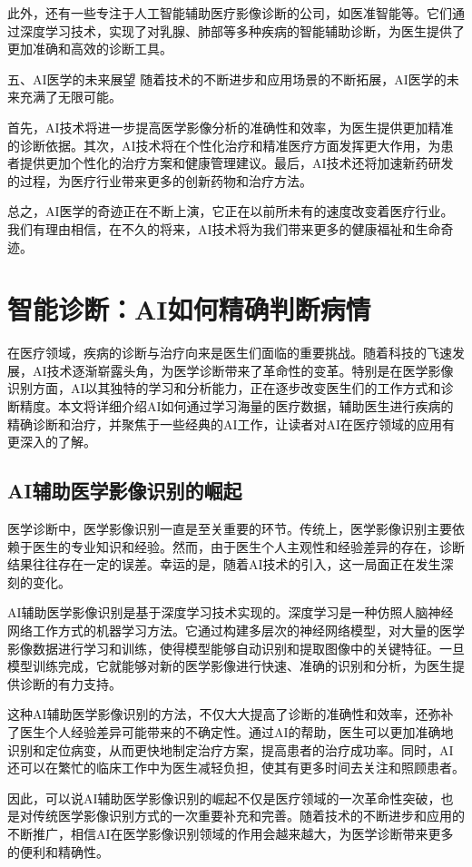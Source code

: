 此外，还有一些专注于人工智能辅助医疗影像诊断的公司，如医准智能等。它们通过深度学习技术，实现了对乳腺、肺部等多种疾病的智能辅助诊断，为医生提供了更加准确和高效的诊断工具。

五、AI医学的未来展望
随着技术的不断进步和应用场景的不断拓展，AI医学的未来充满了无限可能。

首先，AI技术将进一步提高医学影像分析的准确性和效率，为医生提供更加精准的诊断依据。其次，AI技术将在个性化治疗和精准医疗方面发挥更大作用，为患者提供更加个性化的治疗方案和健康管理建议。最后，AI技术还将加速新药研发的过程，为医疗行业带来更多的创新药物和治疗方法。

总之，AI医学的奇迹正在不断上演，它正在以前所未有的速度改变着医疗行业。我们有理由相信，在不久的将来，AI技术将为我们带来更多的健康福祉和生命奇迹。

\section{智能诊断：AI如何精确判断病情}
在医疗领域，疾病的诊断与治疗向来是医生们面临的重要挑战。随着科技的飞速发展，AI技术逐渐崭露头角，为医学诊断带来了革命性的变革。特别是在医学影像识别方面，AI以其独特的学习和分析能力，正在逐步改变医生们的工作方式和诊断精度。本文将详细介绍AI如何通过学习海量的医疗数据，辅助医生进行疾病的精确诊断和治疗，并聚焦于一些经典的AI工作，让读者对AI在医疗领域的应用有更深入的了解。
\subsection{AI辅助医学影像识别的崛起}
医学诊断中，医学影像识别一直是至关重要的环节。传统上，医学影像识别主要依赖于医生的专业知识和经验。然而，由于医生个人主观性和经验差异的存在，诊断结果往往存在一定的误差。幸运的是，随着AI技术的引入，这一局面正在发生深刻的变化。

AI辅助医学影像识别是基于深度学习技术实现的。深度学习是一种仿照人脑神经网络工作方式的机器学习方法。它通过构建多层次的神经网络模型，对大量的医学影像数据进行学习和训练，使得模型能够自动识别和提取图像中的关键特征。一旦模型训练完成，它就能够对新的医学影像进行快速、准确的识别和分析，为医生提供诊断的有力支持。

这种AI辅助医学影像识别的方法，不仅大大提高了诊断的准确性和效率，还弥补了医生个人经验差异可能带来的不确定性。通过AI的帮助，医生可以更加准确地识别和定位病变，从而更快地制定治疗方案，提高患者的治疗成功率。同时，AI还可以在繁忙的临床工作中为医生减轻负担，使其有更多时间去关注和照顾患者。

因此，可以说AI辅助医学影像识别的崛起不仅是医疗领域的一次革命性突破，也是对传统医学影像识别方式的一次重要补充和完善。随着技术的不断进步和应用的不断推广，相信AI在医学影像识别领域的作用会越来越大，为医学诊断带来更多的便利和精确性。
